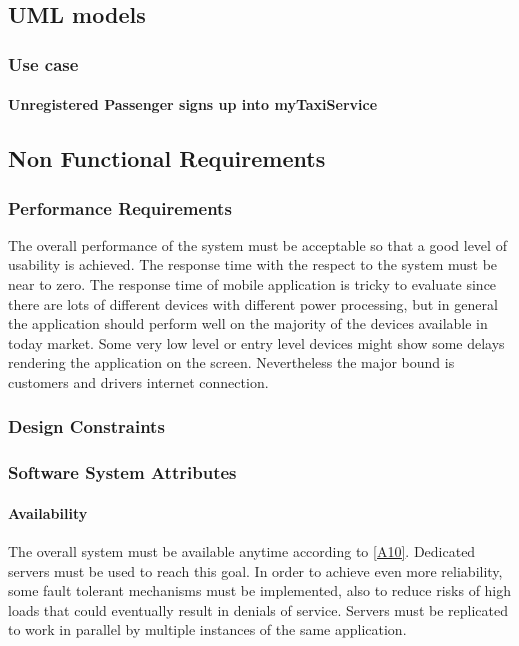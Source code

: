 \documentclass[a4paper,12pt]{article}%
\newcommand{\usecasetable}[5]{
\begin{center}
\begin{tabularx}{\textwidth}{|X|C|}
\hline
Actor & #1\\
\hline
Goal & #2\\
\hline
Event Flow & #3\\
\hline
Output Condition & #4\\
\hline
Exception & #5\\
\hline
\end{tabularx}
\end{center}
}
\begin{document}
\subsection{UML models}
\subsubsection{Use case} 
\paragraph{Unregistered Passenger signs up into myTaxiService}
\pagebreak
\subsection{Non Functional Requirements}
\subsubsection{Performance Requirements}
The overall performance of the system must be acceptable so that a good level of usability is achieved.
The response time with the respect to the system must be near to zero. The response time of mobile application is tricky to evaluate since there are lots of different devices with different power processing, but  in general the application should perform well on the majority of the devices available in today market. Some very low level or entry level devices might show some delays rendering the application on the screen. Nevertheless the major bound is customers and drivers internet connection. 
\subsubsection{Design Constraints}
\subsubsection{Software System Attributes}
\paragraph{Availability} The overall system must be available anytime according to \hyperref[a10]{[A10]}. Dedicated servers must be used to reach this goal. In order to achieve even more reliability, some fault tolerant mechanisms must be implemented, also to reduce risks of high loads that could eventually result in denials of service. Servers must be replicated to work in parallel by multiple instances of the same application. 
\end{document}
